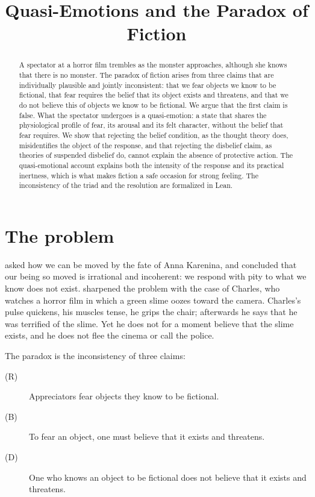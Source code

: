 \documentclass{situationist-preprint}
\title{Quasi-Emotions and the Paradox of Fiction}
\begin{document}
\maketitle

\begin{abstract}
A spectator at a horror film trembles as the monster approaches, although she knows that there is no monster. The paradox of fiction arises from three claims that are individually plausible and jointly inconsistent: that we fear objects we know to be fictional, that fear requires the belief that its object exists and threatens, and that we do not believe this of objects we know to be fictional. We argue that the first claim is false. What the spectator undergoes is a quasi-emotion: a state that shares the physiological profile of fear, its arousal and its felt character, without the belief that fear requires. We show that rejecting the belief condition, as the thought theory does, misidentifies the object of the response, and that rejecting the disbelief claim, as theories of suspended disbelief do, cannot explain the absence of protective action. The quasi-emotional account explains both the intensity of the response and its practical inertness, which is what makes fiction a safe occasion for strong feeling. The inconsistency of the triad and the resolution are formalized in Lean.
\end{abstract}

\section{The problem}

\citet{Radford1975} asked how we can be moved by the fate of Anna Karenina, and concluded that our being so moved is irrational and incoherent: we respond with pity to what we know does not exist. \citet{Walton1978} sharpened the problem with the case of Charles, who watches a horror film in which a green slime oozes toward the camera. Charles's pulse quickens, his muscles tense, he grips the chair; afterwards he says that he was terrified of the slime. Yet he does not for a moment believe that the slime exists, and he does not flee the cinema or call the police.

The paradox is the inconsistency of three claims:

\begin{description}
\item[(R)] Appreciators fear objects they know to be fictional.
\item[(B)] To fear an object, one must believe that it exists and threatens.
\item[(D)] One who knows an object to be fictional does not believe that it exists and threatens.
\end{description}
\end{document}
